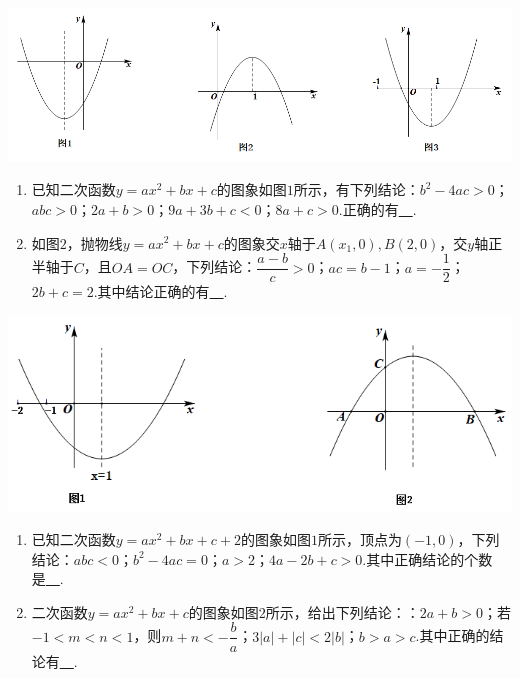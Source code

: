 \documentclass[10pt]{ctexart}
\newcommand{\abs}[1]{\left| #1 \right|}
\begin{document}
\includegraphics[scale=0.6]{figure/l-7.PNG} 
\begin{dkyi}{}{}
  \begin{enumerate}[(1)]
  \item 已知二次函数$y=ax^2+bx+c$的图象如图$1$所示，有下列结论：$b^2-4ac>0$；$abc>0$；$2a+b>0$；$9a+3b+c<0$；$8a+c>0$.正确的有\underline{~\hspace{1cm}~}.
  \item 如图$2$，抛物线$y=ax^2+bx+c$的图象交$x$轴于$A(x_1,0),B(2,0)$，交$y$轴正半轴于$C$，且$OA=OC$，下列结论：$\dfrac{a-b}{c}>0$；$ac=b-1$；$a=-\dfrac{1}{2}$；$2b+c=2$.其中结论正确的有\underline{~\hspace{1cm}~}.
  \end{enumerate}
\end{dkyi}

\includegraphics[scale=0.6]{figure/l-8.PNG} 
\begin{dkyi}{}{}
  \begin{enumerate}[(1)]
  \item 已知二次函数$y=ax^2+bx+c+2$的图象如图$1$所示，顶点为$(-1,0)$，下列结论：$abc<0$；$b^2-4ac=0$；$a>2$；$4a-2b+c>0$.其中正确结论的个数是\underline{~\hspace{1cm}~}.
  \item 二次函数$y=ax^2+bx+c$的图象如图$2$所示，给出下列结论：：$2a+b>0$；若$-1<m<n<1$，则$m+n<-\dfrac{b}{a}$；$3\abs{a}+\abs{c}<2\abs{b}$；$b>a>c$.其中正确的结论有\underline{~\hspace{1cm}~}.
  \end{enumerate}
\end{dkyi}
\end{document}
